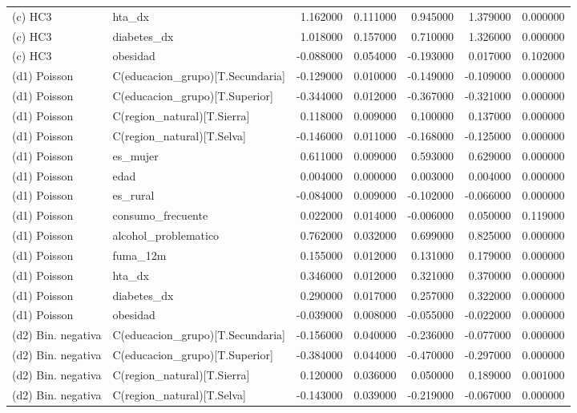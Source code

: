 \begin{longtable}{llrrrrr}
(c) HC3 & hta\_dx & 1.162000 & 0.111000 & 0.945000 & 1.379000 & 0.000000 \\
(c) HC3 & diabetes\_dx & 1.018000 & 0.157000 & 0.710000 & 1.326000 & 0.000000 \\
(c) HC3 & obesidad & -0.088000 & 0.054000 & -0.193000 & 0.017000 & 0.102000 \\
(d1) Poisson & C(educacion\_grupo)[T.Secundaria] & -0.129000 & 0.010000 & -0.149000 & -0.109000 & 0.000000 \\
(d1) Poisson & C(educacion\_grupo)[T.Superior] & -0.344000 & 0.012000 & -0.367000 & -0.321000 & 0.000000 \\
(d1) Poisson & C(region\_natural)[T.Sierra] & 0.118000 & 0.009000 & 0.100000 & 0.137000 & 0.000000 \\
(d1) Poisson & C(region\_natural)[T.Selva] & -0.146000 & 0.011000 & -0.168000 & -0.125000 & 0.000000 \\
(d1) Poisson & es\_mujer & 0.611000 & 0.009000 & 0.593000 & 0.629000 & 0.000000 \\
(d1) Poisson & edad & 0.004000 & 0.000000 & 0.003000 & 0.004000 & 0.000000 \\
(d1) Poisson & es\_rural & -0.084000 & 0.009000 & -0.102000 & -0.066000 & 0.000000 \\
(d1) Poisson & consumo\_frecuente & 0.022000 & 0.014000 & -0.006000 & 0.050000 & 0.119000 \\
(d1) Poisson & alcohol\_problematico & 0.762000 & 0.032000 & 0.699000 & 0.825000 & 0.000000 \\
(d1) Poisson & fuma\_12m & 0.155000 & 0.012000 & 0.131000 & 0.179000 & 0.000000 \\
(d1) Poisson & hta\_dx & 0.346000 & 0.012000 & 0.321000 & 0.370000 & 0.000000 \\
(d1) Poisson & diabetes\_dx & 0.290000 & 0.017000 & 0.257000 & 0.322000 & 0.000000 \\
(d1) Poisson & obesidad & -0.039000 & 0.008000 & -0.055000 & -0.022000 & 0.000000 \\
(d2) Bin. negativa & C(educacion\_grupo)[T.Secundaria] & -0.156000 & 0.040000 & -0.236000 & -0.077000 & 0.000000 \\
(d2) Bin. negativa & C(educacion\_grupo)[T.Superior] & -0.384000 & 0.044000 & -0.470000 & -0.297000 & 0.000000 \\
(d2) Bin. negativa & C(region\_natural)[T.Sierra] & 0.120000 & 0.036000 & 0.050000 & 0.189000 & 0.001000 \\
(d2) Bin. negativa & C(region\_natural)[T.Selva] & -0.143000 & 0.039000 & -0.219000 & -0.067000 & 0.000000 \\

\end{longtable}
